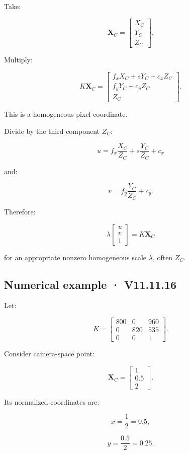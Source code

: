 Take:

\[
 \mathbf X_C= \begin{bmatrix} X_C\\Y_C\\Z_C \end{bmatrix}.
\]

Multiply:

\[
 K\mathbf X_C= \begin{bmatrix} f_xX_C+sY_C+c_xZ_C\\ f_yY_C+c_yZ_C\\ Z_C \end{bmatrix}.
\]

This is a homogeneous pixel coordinate.

Divide by the third component \(Z_C\):

\[
 \boxed{ u=f_x\frac{X_C}{Z_C} +s\frac{Y_C}{Z_C} +c_x }
\]

and:

\[
 \boxed{ v=f_y\frac{Y_C}{Z_C} +c_y }.
\]

Therefore:

\[
 \boxed{ \lambda \begin{bmatrix}u\\v\\1\end{bmatrix} = K\mathbf X_C }
\]

for an appropriate nonzero homogeneous scale \(\lambda\), often \(Z_C\).

\subsection{Numerical example · V11.11.16}\label{02-foundations-ii-ch034-numerical-example-v11.11.16}

Let:

\[
 K= \begin{bmatrix} 800&0&960\\ 0&820&535\\ 0&0&1 \end{bmatrix}.
\]

Consider camera-space point:

\[
 \mathbf X_C= \begin{bmatrix}1\\0.5\\2\end{bmatrix}.
\]

Its normalized coordinates are:

\[
 x=\frac12=0.5,
\]

\[
 y=\frac{0.5}{2}=0.25.
\]

